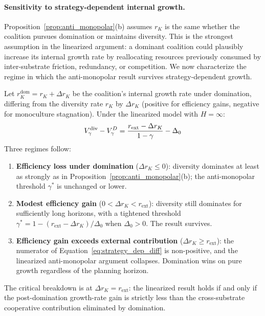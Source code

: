 \paragraph{Sensitivity to strategy-dependent internal growth.}
Proposition~\ref{prop:anti_monopolar}(b) assumes $r_K$ is the same whether
the coalition pursues domination or maintains diversity. This is the
strongest assumption in the linearized argument: a dominant coalition could
plausibly increase its internal growth rate by reallocating resources
previously consumed by inter-substrate friction, redundancy, or
competition. We now characterize the regime in which the anti-monopolar
result survives strategy-dependent growth.

\begin{corollary}
\label{cor:strategy_dependent}
Let $r_K^{\mathrm{dom}} = r_K + \Delta r_K$ be the coalition's internal
    growth rate under domination, differing from the diversity rate $r_K$
    by $\Delta r_K$ (positive for efficiency gains, negative for
    monoculture stagnation). Under the linearized model with $H = \infty$:
\begin{equation}
\label{eq:strategy_dep_diff}
V_\gamma^{\mathrm{div}} - V_\gamma^{D} =
    \frac{r_{\mathrm{ext}} - \Delta r_K}{1 - \gamma} - \Delta_0
\end{equation}
Three regimes follow:
\begin{enumerate}
\item[\textbf{(i)}] \textbf{Efficiency loss under domination}
    ($\Delta r_K \leq 0$): diversity dominates at least as strongly as in
    Proposition~\ref{prop:anti_monopolar}(b); the anti-monopolar threshold
    $\gamma^*$ is unchanged or lower.
\item[\textbf{(ii)}] \textbf{Modest efficiency gain}
    ($0 < \Delta r_K < r_{\mathrm{ext}}$): diversity still dominates for
    sufficiently long horizons, with a tightened threshold
    $\gamma^* = 1 - (r_{\mathrm{ext}} - \Delta r_K) / \Delta_0$ when
    $\Delta_0 > 0$. The result survives.
\item[\textbf{(iii)}] \textbf{Efficiency gain exceeds external
    contribution} ($\Delta r_K \geq r_{\mathrm{ext}}$): the numerator of
    Equation~\eqref{eq:strategy_dep_diff} is non-positive, and the
    linearized anti-monopolar argument collapses. Domination wins on pure
    growth regardless of the planning horizon.
\end{enumerate}
The critical breakdown is at $\Delta r_K = r_{\mathrm{ext}}$: the
    linearized result holds if and only if the post-domination growth-rate
    gain is strictly less than the cross-substrate cooperative contribution
    eliminated by domination.
\end{corollary}

